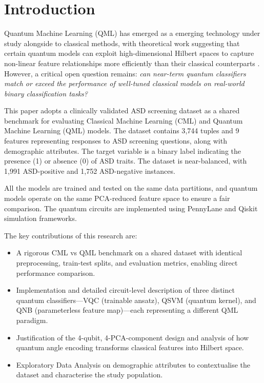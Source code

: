 \documentclass[runningheads]{llncs}
\begin{document}


\section{Introduction}\label{sec1}
Quantum Machine Learning (QML) has emerged as a emerging technology under study alongside to classical methods, with theoretical work suggesting that certain quantum models can exploit high-dimensional Hilbert spaces to capture non-linear feature relationships more efficiently than their classical counterparts \cite{saranya2025}. However, a critical open question remains: \emph{can near-term quantum classifiers match or exceed the performance of well-tuned classical models on real-world binary classification tasks?}

This paper adopts a clinically validated ASD screening dataset \cite{asddataset} as a shared benchmark for evaluating Classical Machine Learning (CML) and Quantum Machine Learning (QML) models. The dataset contains 3{,}744 tuples and 9 features representing responses to ASD screening questions, along with demographic attributes. The target variable is a binary label indicating the presence (1) or absence (0) of ASD traits. The dataset is near-balanced, with 1{,}991 ASD-positive and 1{,}752 ASD-negative instances.

All the models are trained and tested on the same data partitions, and quantum models operate on the same PCA-reduced feature space to ensure a fair comparison. The quantum circuits are implemented using PennyLane and Qiskit simulation frameworks.

The key contributions of this research are:
\begin{itemize}
\item A rigorous CML vs QML benchmark on a shared dataset with identical preprocessing, train-test splits, and evaluation metrics, enabling direct performance comparison.
\item Implementation and detailed circuit-level description of three distinct quantum classifiers---VQC (trainable ansatz), QSVM (quantum kernel), and QNB (parameterless feature map)---each representing a different QML paradigm.
\item Justification of the 4-qubit, 4-PCA-component design and analysis of how quantum angle encoding transforms classical features into Hilbert space.
\item Exploratory Data Analysis on demographic attributes to contextualise the dataset and characterise the study population.
\end{itemize}
\end{document}
